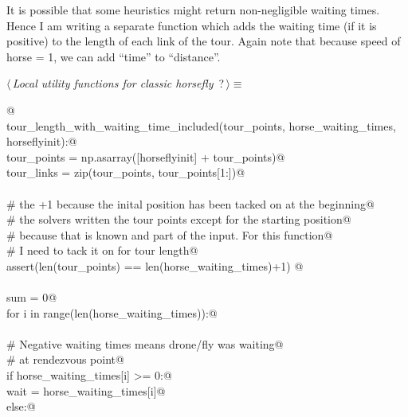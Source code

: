\documentclass[11.5pt]{report}
\begin{document}
\newchunk It is possible that some heuristics might return non-negligible
      waiting times. Hence I am writing a separate function which
      adds the waiting time (if it is positive) to the length of 
      each link of the tour. Again note that because 
      speed of horse = 1, we can add ``time'' to ``distance''. 

\begin{flushleft} \small\label{scrap42}\raggedright\small
{} $\langle\,${\itshape Local utility functions for classic horsefly}\nobreak\ {\footnotesize {?}}$\,\rangle\equiv$
\vspace{-1ex}
\begin{list}{}{} \item
\mbox{}\verb@   @\\
\mbox{}\verb@def tour_length_with_waiting_time_included(tour_points, horse_waiting_times, horseflyinit):@\\
\mbox{}\verb@      tour_points   = np.asarray([horseflyinit] + tour_points)@\\
\mbox{}\verb@      tour_links    = zip(tour_points, tour_points[1:])@\\
\mbox{}\verb@@\\
\mbox{}\verb@      # the +1 because the inital position has been tacked on at the beginning@\\
\mbox{}\verb@      # the solvers written the tour points except for the starting position@\\
\mbox{}\verb@      # because that is known and part of the input. For this function@\\
\mbox{}\verb@      # I need to tack it on for tour length@\\
\mbox{}\verb@      assert(len(tour_points) == len(horse_waiting_times)+1) @\\
\mbox{}\verb@@\\
\mbox{}\verb@      sum = 0@\\
\mbox{}\verb@      for i in range(len(horse_waiting_times)):@\\
\mbox{}\verb@@\\
\mbox{}\verb@          # Negative waiting times means drone/fly was waiting@\\
\mbox{}\verb@          # at rendezvous point@\\
\mbox{}\verb@          if horse_waiting_times[i] >= 0:@\\
\mbox{}\verb@              wait = horse_waiting_times[i]@\\
\mbox{}\verb@          else:@\\

\end{list}
\end{flushleft}
\end{document}
